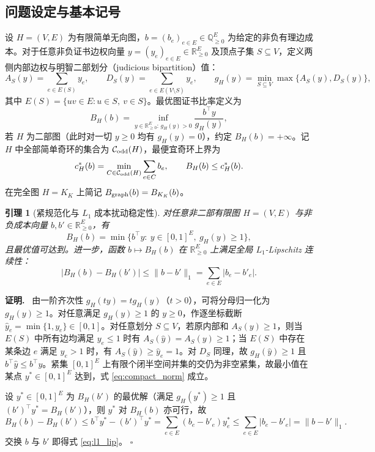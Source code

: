 \documentclass[11pt,a4paper]{ctexart}
\newtheorem{lemma}[theorem]{引理}
\theoremstyle{definition}
\newenvironment{proofcn}{\par\noindent\textbf{证明.}\ }{\hfill$\square$\par}
\newcommand{\Odd}{\mathcal C_{\rm odd}}
\newcommand{\RR}{\mathbb R}
\newcommand{\QQ}{\mathbb Q}
\newcommand{\1}{\boldsymbol 1}
\newcommand{\0}{\boldsymbol 0}
\newcommand{\bgraph}{B_{\rm graph}}
\begin{document}
\subsection{问题设定与基本记号}
设 $H=(V,E)$ 为有限简单无向图，$b=(b_e)_{e\in E}\in\QQ_{\ge 0}^E$ 为给定的非负有理边成本。对于任意非负证书边权向量 $y=(y_e)_{e\in E}\in\RR_{\ge 0}^E$ 及顶点子集 $S\subseteq V$，定义两侧内部边权与明智二部划分（judicious bipartition）值：
\begin{equation}\label{eq:ADg}
 A_S(y)=\sum_{e\in E(S)}y_e,\qquad
 D_S(y)=\sum_{e\in E(V\setminus S)}y_e,\qquad
 g_H(y)=\min_{S\subseteq V}\max\{A_S(y),D_S(y)\},
\end{equation}
其中 $E(S)=\{uv\in E:u\in S,\ v\in S\}$。最优图证书比率定义为
\begin{equation}\label{eq:B_def}
 \boxed{B_H(b)=\inf_{y\in\RR_{\ge 0}^E:\,g_H(y)>0}\frac{b^\top y}{g_H(y)},}
\end{equation}
若 $H$ 为二部图（此时对一切 $y\ge 0$ 均有 $g_H(y)=0$），约定 $B_H(b)=+\infty$。记 $H$ 中全部简单奇环的集合为 $\Odd(H)$，最便宜奇环上界为
\begin{equation}\label{eq:cstar_def}
 c_H^*(b)=\min_{C\in\Odd(H)}\sum_{e\in C}b_e,\qquad B_H(b)\le c_H^*(b).
\end{equation}
在完全图 $H=K_K$ 上简记 $\bgraph(b)=B_{K_K}(b)$。

\begin{lemma}[紧规范化与 $L_1$ 成本扰动稳定性]\label{lem:lip}
对任意非二部有限图 $H=(V,E)$ 与非负成本向量 $b,b'\in\RR_{\ge 0}^E$，有
\begin{equation}\label{eq:compact_norm}
 B_H(b)=\min\bigl\{b^\top y:\ y\in[0,1]^E,\ g_H(y)\ge 1\bigr\},
\end{equation}
且最优值可达到。进一步，函数 $b\mapsto B_H(b)$ 在 $\RR_{\ge 0}^E$ 上满足全局 $L_1$-Lipschitz 连续性：
\begin{equation}\label{eq:l1_lip}
 \boxed{\bigl|B_H(b)-B_H(b')\bigr|\le \|b-b'\|_1=\sum_{e\in E}|b_e-b'_e|.}
\end{equation}
\end{lemma}
\begin{proofcn}
由一阶齐次性 $g_H(ty)=t g_H(y)$（$t>0$），可将分母归一化为 $g_H(y)\ge 1$。对任意满足 $g_H(y)\ge 1$ 的 $y\ge 0$，作逐坐标截断 $\hat y_e=\min\{1,y_e\}\in[0,1]$。对任意划分 $S\subseteq V$，若原内部和 $A_S(y)\ge 1$，则当 $E(S)$ 中所有边均满足 $y_e\le 1$ 时有 $A_S(\hat y)=A_S(y)\ge 1$；当 $E(S)$ 中存在某条边 $e$ 满足 $y_e>1$ 时，有 $A_S(\hat y)\ge \hat y_e=1$。对 $D_S$ 同理，故 $g_H(\hat y)\ge 1$ 且 $b^\top\hat y\le b^\top y$。紧集 $[0,1]^E$ 上有限个闭半空间并集的交仍为非空紧集，故最小值在某点 $y^*\in[0,1]^E$ 达到，式 \eqref{eq:compact_norm} 成立。

设 $y^*\in[0,1]^E$ 为 $B_H(b')$ 的最优解（满足 $g_H(y^*)\ge 1$ 且 $(b')^\top y^*=B_H(b')$），则 $y^*$ 对 $B_H(b)$ 亦可行，故
\[
 B_H(b)-B_H(b')\le b^\top y^*-(b')^\top y^*=\sum_{e\in E}(b_e-b'_e)y^*_e\le \sum_{e\in E}|b_e-b'_e|=\|b-b'\|_1.
\]
交换 $b$ 与 $b'$ 即得式 \eqref{eq:l1_lip}。
\end{proofcn}
\end{document}
